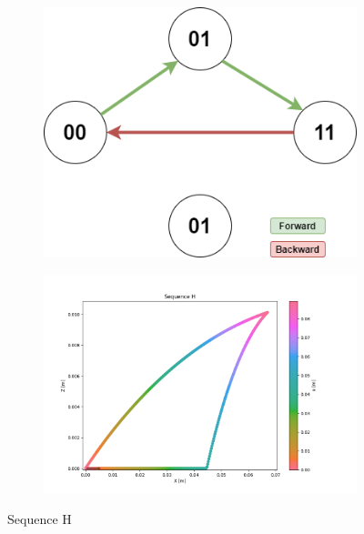         \begin{figure}[h]
            \begin{subfigure}{.3\textwidth}
            \includegraphics[width=\textwidth]{images/Sequences-Sequence H.png}
            \end{subfigure}%
            \begin{subfigure}{.7\textwidth}
            \includegraphics[width=\textwidth]{images/H.png}
            \end{subfigure}
            \caption{Sequence H}
        \end{figure}

